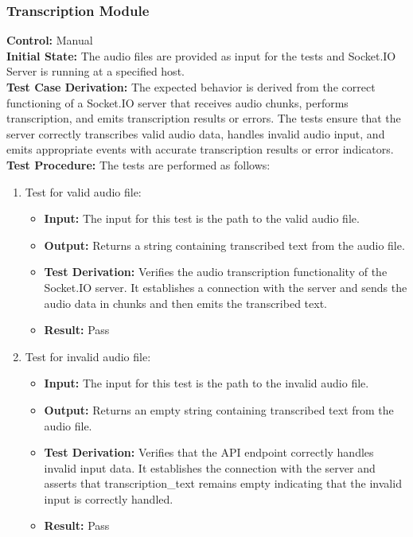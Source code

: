 \documentclass[12pt, titlepage]{article}
\begin{document}
  \subsubsection{Transcription Module}

  \textbf{Control:} Manual\\
  \textbf{Initial State:} The audio files are provided as input for the tests and Socket.IO Server is running at a specified host.\\
  \textbf{Test Case Derivation:} The expected behavior is derived from the correct functioning of a Socket.IO server that receives audio chunks, performs transcription, and emits transcription results or errors. The tests ensure that the server correctly transcribes valid audio data, handles invalid audio input, and emits appropriate events with accurate transcription results or error indicators.\\
  \textbf{Test Procedure:} The tests are performed as follows:\\

  \begin{enumerate}
    \item Test for valid audio file:
      \begin{itemize}
        \item \textbf{Input:} The input for this test is the path to the valid audio file.   
        \item \textbf{Output:} Returns a string containing transcribed text from the audio file.
        \item \textbf{Test Derivation:} Verifies the audio transcription functionality of the Socket.IO server. It establishes a connection with the server and sends the audio data in chunks and then emits the transcribed text. 
        \item \textbf{Result:} Pass
      \end{itemize}

    \item Test for invalid audio file:
      \begin{itemize}
        \item \textbf{Input:} The input for this test is the path to the invalid audio file. 
        \item \textbf{Output:} Returns an empty string containing transcribed text from the audio file.  
        \item \textbf{Test Derivation:} Verifies that the API endpoint correctly handles invalid input data. It establishes the connection with the server and asserts that transcription\_text remains empty indicating that the invalid input is correctly handled.
        \item \textbf{Result:} Pass
      \end{itemize}
  \end{enumerate}
\end{document}

